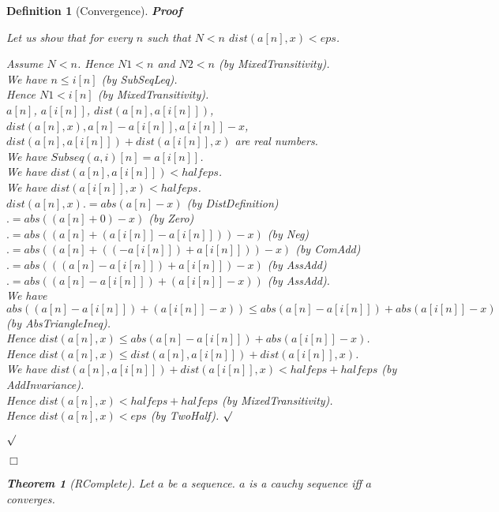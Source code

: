 \documentclass{article}
\newenvironment{forthel}{\begin{leftbar}}{\end{leftbar}}
\newenvironment{proof}{\noindent\textbf{Proof\ }}{\hspace*{\fill}$\Box$\medskip}
\newenvironment{subproof}{\begin{list}{}{}
		\item[\text{Proof}]}{\hfill $\surd$ \end{list}}
\newtheorem{theorem}{Theorem}
\newtheorem{definition}{Definition}
\begin{document}
\begin{forthel}
\begin{definition}[Convergence]
\begin{proof}
\begin{subproof}
			Let us show that for every $n$ such that $N < n$ $dist(a[n],x) < eps$.
			\begin{subproof}
				Assume $N < n$. Hence $N1 < n$ and $N2 < n$ (by MixedTransitivity).\\
				We have $n \leq i[n]$ (by SubSeqLeq).\\
				Hence $N1 < i[n]$ (by MixedTransitivity).\\
				$a[n]$, $a[i[n]]$, $dist(a[n],a[i[n]])$, $dist(a[n],x), a[n] - a[i[n]], a[i[n]] - x$, $dist(a[n],a[i[n]]) + dist(a[i[n]],x)$ are real numbers.\\
				We have $Subseq(a,i)[n] = a[i[n]]$.\\
				We have $dist(a[n],a[i[n]]) < halfeps$.\\
				We have $dist(a[i[n]],x) < halfeps$.\\
				$dist(a[n],x) .= abs(a[n] - x)$ (by DistDefinition)\\
				$.= abs((a[n] + 0) - x)$ (by Zero)\\
				$.= abs((a[n] + (a[i[n]] - a[i[n]])) - x)$ (by Neg)\\
				$.= abs((a[n] + ((-a[i[n]]) + a[i[n]])) - x)$ (by ComAdd)\\
				$.= abs(((a[n] - a[i[n]]) + a[i[n]]) - x)$ (by AssAdd)\\
				$.= abs((a[n] - a[i[n]]) + (a[i[n]] - x))$ (by AssAdd).\\
				We have $abs((a[n] - a[i[n]]) + (a[i[n]] - x)) \leq abs(a[n] - a[i[n]]) + abs(a[i[n]] - x)$ (by AbsTriangleIneq).\\
				Hence $dist(a[n],x) \leq abs(a[n] - a[i[n]]) + abs(a[i[n]] - x)$.\\
				Hence $dist(a[n],x) \leq dist(a[n],a[i[n]]) + dist(a[i[n]],x)$.\\
				We have $dist(a[n],a[i[n]]) + dist(a[i[n]],x) < halfeps + halfeps$ (by AddInvariance).\\
				Hence $dist(a[n],x) < halfeps + halfeps$ (by MixedTransitivity).\\
				Hence $dist(a[n],x) < eps$ (by TwoHalf).
			\end{subproof}
			
		\end{subproof}
	\end{proof}
	
	\begin{theorem}[RComplete]
		Let $a$ be a sequence. $a$ is a cauchy sequence iff $a$ converges.
	\end{theorem}
	

\end{definition}
\end{forthel}
\end{document}
